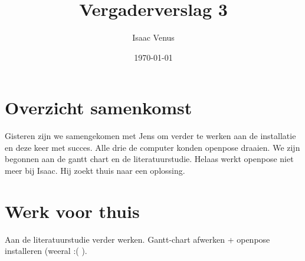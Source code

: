 \documentclass[a4paper,kulak]{kulakarticle} %
\date{\today}
\title{Vergaderverslag 3}
\author{Isaac Venus}
\begin{document}
\maketitle

\section{Overzicht samenkomst}
	Gisteren zijn we samengekomen met Jens om verder te werken aan de installatie en deze keer met succes. Alle drie de computer konden openpose draaien.
	We zijn begonnen aan de gantt chart en de literatuurstudie. Helaas werkt openpose niet meer bij Isaac. Hij zoekt thuis naar een oplossing.

\section{Werk voor thuis}
	Aan de literatuurstudie verder werken. Gantt-chart afwerken + openpose installeren (weeral :( ).
\end{document}
